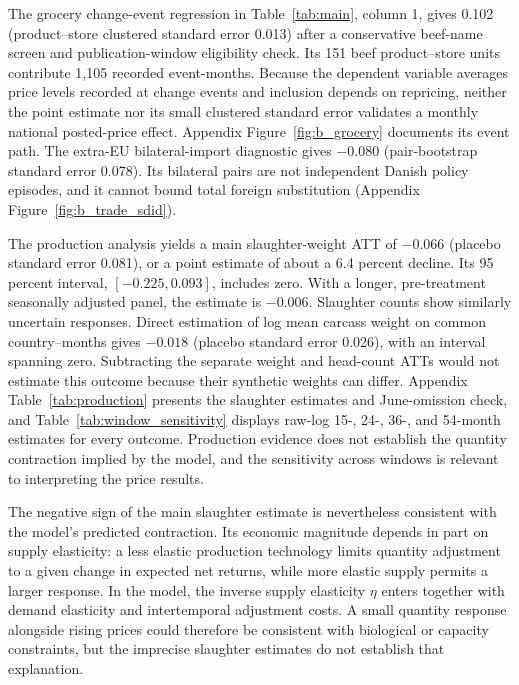 \documentclass[11pt]{article}
\begin{document}
The grocery change-event regression in Table~\ref{tab:main}, column 1, gives 0.102 (product--store clustered standard error 0.013) after a conservative beef-name screen and publication-window eligibility check. Its 151 beef product--store units contribute 1,105 recorded event-months. Because the dependent variable averages price levels recorded at change events and inclusion depends on repricing, neither the point estimate nor its small clustered standard error validates a monthly national posted-price effect. Appendix Figure~\ref{fig:b_grocery} documents its event path. The extra-EU bilateral-import diagnostic gives $-0.080$ (pair-bootstrap standard error 0.078). Its bilateral pairs are not independent Danish policy episodes, and it cannot bound total foreign substitution (Appendix Figure~\ref{fig:b_trade_sdid}).

The production analysis yields a main slaughter-weight ATT of $-0.066$ (placebo standard error 0.081), or a point estimate of about a 6.4 percent decline. Its 95 percent interval, $[-0.225,0.093]$, includes zero. With a longer, pre-treatment seasonally adjusted panel, the estimate is $-0.006$. Slaughter counts show similarly uncertain responses. Direct estimation of log mean carcass weight on common country--months gives $-0.018$ (placebo standard error 0.026), with an interval spanning zero. Subtracting the separate weight and head-count ATTs would not estimate this outcome because their synthetic weights can differ. Appendix Table~\ref{tab:production} presents the slaughter estimates and June-omission check, and Table~\ref{tab:window_sensitivity} displays raw-log 15-, 24-, 36-, and 54-month estimates for every outcome. Production evidence does not establish the quantity contraction implied by the model, and the sensitivity across windows is relevant to interpreting the price results.

The negative sign of the main slaughter estimate is nevertheless consistent with the model's predicted contraction. Its economic magnitude depends in part on supply elasticity: a less elastic production technology limits quantity adjustment to a given change in expected net returns, while more elastic supply permits a larger response. In the model, the inverse supply elasticity $\eta$ enters together with demand elasticity and intertemporal adjustment costs. A small quantity response alongside rising prices could therefore be consistent with biological or capacity constraints, but the imprecise slaughter estimates do not establish that explanation.
\end{document}
